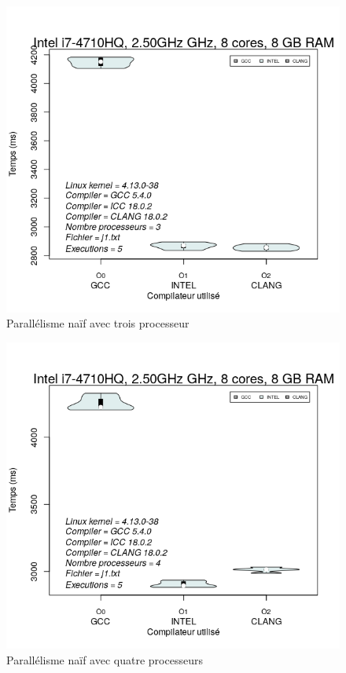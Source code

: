 \documentclass[
 aip,
 jmp,
 amsmath,amssymb,
 reprint
]{revtex4-1}
\begin{document}
\begin{figure}[H]
  \caption{Parallélisme naïf avec trois processeur}
  \includegraphics[width=\linewidth, keepaspectratio=true]{naif_3.png}
\end{figure}

\begin{figure}[H]
  \caption{Parallélisme naïf avec quatre processeurs}
  \includegraphics[width=\linewidth, keepaspectratio=true]{naif_4.png}
\end{figure}
\end{document}
